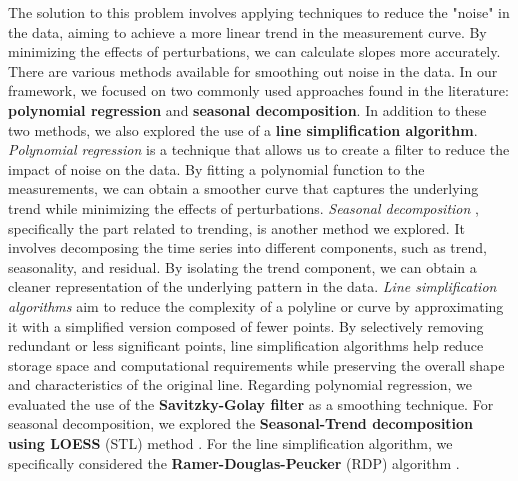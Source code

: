 The solution to this problem involves applying techniques to reduce the "noise" in the data, aiming to achieve a more linear trend in the measurement curve. By minimizing the effects of perturbations, we can calculate slopes more accurately.\newline
There are various methods available for smoothing out noise in the data. In our framework, we focused on two commonly used approaches found in the literature: \textbf{polynomial regression} and \textbf{seasonal decomposition}. In addition to these two methods, we also explored the use of a \textbf{line simplification algorithm}.\newline \newline
\textit{Polynomial regression} \cite{polynomial_regression} is a technique that allows us to create a filter to reduce the impact of noise on the data. By fitting a polynomial function to the measurements, we can obtain a smoother curve that captures the underlying trend while minimizing the effects of perturbations.\newline
\textit{Seasonal decomposition} \cite{seasonal_decomposition}, specifically the part related to trending, is another method we explored. It involves decomposing the time series into different components, such as trend, seasonality, and residual. By isolating the trend component, we can obtain a cleaner representation of the underlying pattern in the data.\newline
\textit{Line simplification algorithms} \cite{line_simplification_algo} aim to reduce the complexity of a polyline or curve by approximating it with a simplified version composed of fewer points. By selectively removing redundant or less significant points, line simplification algorithms help reduce storage space and computational requirements while preserving the overall shape and characteristics of the original line.\newline
Regarding polynomial regression, we evaluated the use of the \textbf{Savitzky-Golay filter} \cite{savgol} as a smoothing technique. For seasonal decomposition, we explored the \textbf{Seasonal-Trend decomposition using LOESS} (STL) method \cite{stl_decomp}. For the line simplification algorithm, we specifically considered the \textbf{Ramer-Douglas-Peucker} (RDP) algorithm \cite{ramer-douglas-peucker}.\newline \newline

